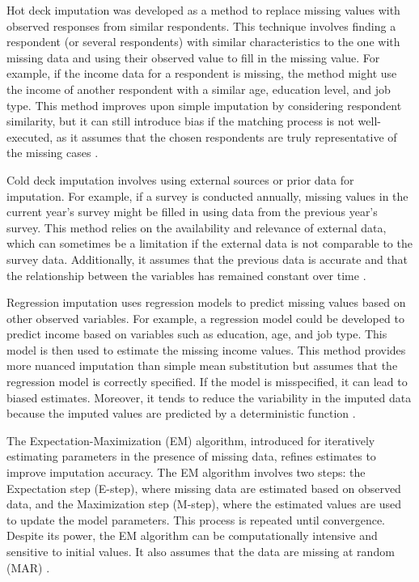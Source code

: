 Hot deck imputation was developed as a method to replace missing values with observed responses from similar respondents. This technique involves finding a respondent (or several respondents) with similar characteristics to the one with missing data and using their observed value to fill in the missing value. For example, if the income data for a respondent is missing, the method might use the income of another respondent with a similar age, education level, and job type. This method improves upon simple imputation by considering respondent similarity, but it can still introduce bias if the matching process is not well-executed, as it assumes that the chosen respondents are truly representative of the missing cases \cite{andridge2010review}.

Cold deck imputation involves using external sources or prior data for imputation. For example, if a survey is conducted annually, missing values in the current year's survey might be filled in using data from the previous year's survey. This method relies on the availability and relevance of external data, which can sometimes be a limitation if the external data is not comparable to the survey data. Additionally, it assumes that the previous data is accurate and that the relationship between the variables has remained constant over time \cite{little2019statistical}.

Regression imputation uses regression models to predict missing values based on other observed variables. For example, a regression model could be developed to predict income based on variables such as education, age, and job type. This model is then used to estimate the missing income values. This method provides more nuanced imputation than simple mean substitution but assumes that the regression model is correctly specified. If the model is misspecified, it can lead to biased estimates. Moreover, it tends to reduce the variability in the imputed data because the imputed values are predicted by a deterministic function \cite{kang2013prevention}.

The Expectation-Maximization (EM) algorithm, introduced for iteratively estimating parameters in the presence of missing data, refines estimates to improve imputation accuracy. The EM algorithm involves two steps: the Expectation step (E-step), where missing data are estimated based on observed data, and the Maximization step (M-step), where the estimated values are used to update the model parameters. This process is repeated until convergence. Despite its power, the EM algorithm can be computationally intensive and sensitive to initial values. It also assumes that the data are missing at random (MAR) \cite{dempster1977maximum}.

